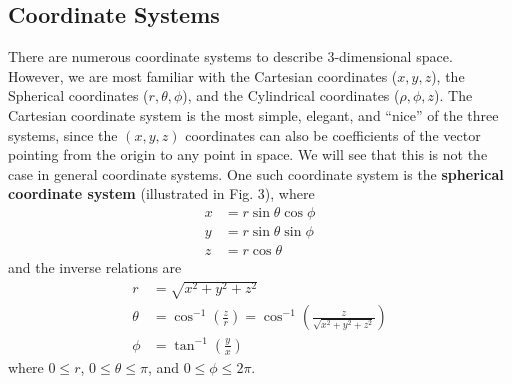 \documentclass{article}
\theoremstyle{definition}
\begin{document}
\subsection{Coordinate Systems}
There are numerous coordinate systems to describe 3-dimensional space. However, we are most familiar with the Cartesian coordinates ($x,y,z$), the Spherical coordinates ($r,\theta,\phi$), and the Cylindrical coordinates ($\rho, \phi, z$). The Cartesian coordinate system is the most simple, elegant, and ``nice'' of the three systems, since the $(x,y,z)$ coordinates can also be coefficients of the vector pointing from the origin to any point in space. We will see that this is not the case in general coordinate systems. One such coordinate system is the \textbf{spherical coordinate system} (illustrated in Fig. 3), where
\begin{align*}
x &= r\sin\theta\cos\phi\\
y &= r\sin\theta\sin\phi\\
z &= r\cos\theta
\end{align*}
and the inverse relations are
\begin{align*}
r &= \sqrt{x^2+y^2+z^2}\\
\theta &= \cos^{-1}\left( \frac{z}{r}\right) = \cos^{-1}\left( \frac{z}{\sqrt{x^2+y^2+z^2}}\right) \\
\phi &= \tan^{-1}\left( \frac{y}{x} \right) 
\end{align*}
where $0 \leq r$, $0 \leq \theta \leq \pi$, and $0 \leq \phi \leq 2\pi$.
\end{document}
